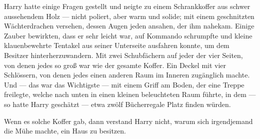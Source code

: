 Harry hatte einige Fragen gestellt und neigte zu einem Schrankkoffer aus schwer aussehendem Holz — nicht poliert, aber warm und solide; mit einem geschnitzten Wächterdrachen versehen, dessen Augen jeden ansahen, der ihm nahekam. Einige Zauber bewirkten, dass er sehr leicht war, auf Kommando schrumpfte und kleine klauenbewehrte Tentakel aus seiner Unterseite ausfahren konnte, um dem Besitzer hinterherzuwandern. Mit zwei Schubfächern auf jeder der vier Seiten, von denen jedes so groß war wie der gesamte Koffer. Ein Deckel mit vier Schlössern, von denen jedes einen anderen Raum im Inneren zugänglich machte. Und — das war das Wichtigste — mit einem Griff am Boden, der eine Treppe freilegte, welche nach unten in einen kleinen beleuchteten Raum führte, in dem — so hatte Harry geschätzt — etwa zwölf Bücherregale Platz finden würden.

Wenn es solche Koffer gab, dann verstand Harry nicht, warum sich irgendjemand die Mühe machte, ein Haus zu besitzen.

